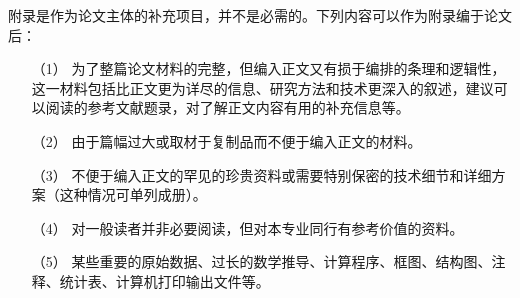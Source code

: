 \appendix
附录是作为论文主体的补充项目，并不是必需的。下列内容可以作为附录编于论文后：
\begin{enumerate}
    \item [（1）] 为了整篇论文材料的完整，但编入正文又有损于编排的条理和逻辑性，这一材料包括比正文更为详尽的信息、研究方法和技术更深入的叙述，建议可以阅读的参考文献题录，对了解正文内容有用的补充信息等。
    \item [（2）] 由于篇幅过大或取材于复制品而不便于编入正文的材料。
    \item [（3）] 不便于编入正文的罕见的珍贵资料或需要特别保密的技术细节和详细方案（这种情况可单列成册）。
    \item [（4）] 对一般读者并非必要阅读，但对本专业同行有参考价值的资料。
    \item [（5）] 某些重要的原始数据、过长的数学推导、计算程序、框图、结构图、注释、统计表、计算机打印输出文件等。
\end{enumerate}